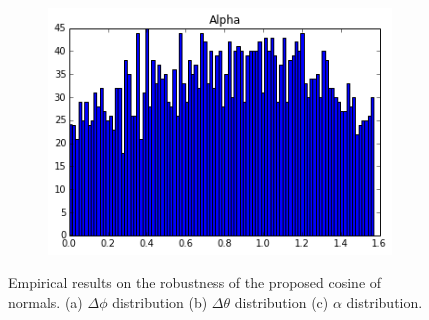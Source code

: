 \begin{figure}[t]
\begin{subfigure}{0.3\textwidth}
        \includegraphics[width=\textwidth]{images/alpha}
        \subcaption{}
        \label{subfig:robust-alpha}
    \end{subfigure}
    \caption{Empirical results on the robustness of the proposed cosine of normals. (a) $\Delta \phi$ distribution (b) $\Delta \theta$ distribution (c) $\alpha$ distribution.}
    \label{fig:robust-properties}
\end{figure}

